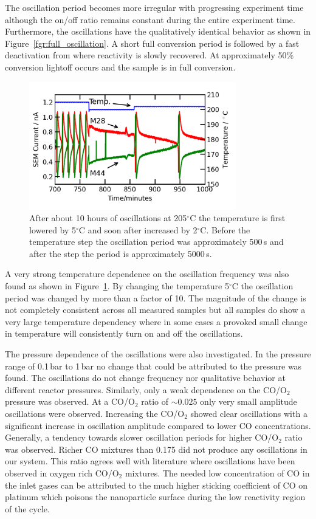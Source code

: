 \documentclass[8.5pt,twoside,twocolumn]{article}
\begin{document}
The oscillation period becomes more irregular with progressing experiment time although the on/off ratio remains constant during the entire experiment time. Furthermore, the oscillations have the qualitatively identical behavior as shown in Figure~\ref{fgr:full_oscillation}. A short full conversion period is followed by a fast deactivation from where reactivity is slowly recovered. At approximately 50\% conversion lightoff occurs and the sample is in full conversion.

\begin{figure}[h]
\centering
  \includegraphics[width=9cm]{temperature_dependence.png}
  \caption{After about 10 hours of oscillations at 205$^\circ$C the temperature is first lowered by 5$^\circ$C and soon after increased by 2$^\circ$C. Before the temperature step the oscillation period was approximately 500\,s and after the step the period is approximately 5000\,s.}
  \label{fgr:temperature_dependence}
\end{figure}
A very strong temperature dependence on the oscillation frequency was also found as shown in Figure~\ref{fgr:temperature_dependence}. By changing the temperature 5$^\circ$C the oscillation period was changed by more than a factor of 10. The magnitude of the change is not completely consistent across all measured samples but all samples do show a very large temperature dependency where in some cases a provoked small change in temperature will consistently turn on and off the oscillations.

The pressure dependence of the oscillations were also investigated. In the pressure range of 0.1\,bar to 1\,bar no change that could be attributed to the pressure was found. The oscillations do not change frequency nor qualitative behavior at different reactor pressures. Similarly, only a weak dependence on the CO/O$_2$ pressure was observed. At a CO/O$_2$ ratio of $\sim0.025$ only very small amplitude oscillations were observed. Increasing the CO/O$_2$ showed clear oscillations with a significant increase in oscillation amplitude compared to lower CO concentrations. Generally, a tendency towards slower oscillation periods for higher CO/O$_2$ ratio was observed. Richer CO mixtures than 0.175 did not produce any oscillations in our system. This ratio agrees well with literature \cite{Singh2010,Hendriksen2005} where oscillations have been observed in oxygen rich CO/O$_2$ mixtures. The needed low concentration of CO in the inlet gases can be attributed to the much higher sticking coefficient of CO on platinum which poisons the nanoparticle surface during the low reactivity region of the cycle.
\end{document}
